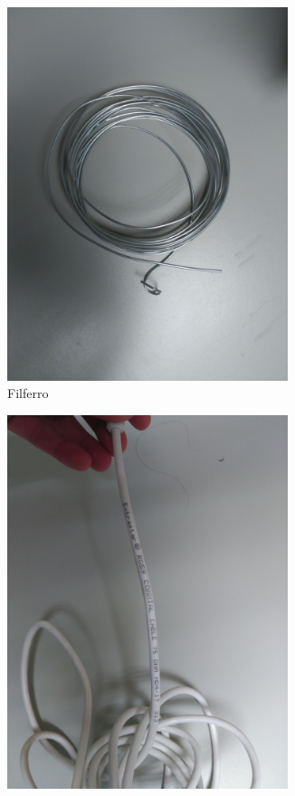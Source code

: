 \begin{figure}[H]
\centering
\begin{subfigure}{.5\textwidth}
	\centering
	\includegraphics[width=0.9\textwidth]{./images/filferro.jpg}
	\caption{Filferro}
	\label{filferro}
\end{subfigure}%
\begin{subfigure}{.5\textwidth}
	\centering
	\includegraphics[width=0.9\textwidth]{./images/cable.jpg}

\end{subfigure}
\end{figure}
